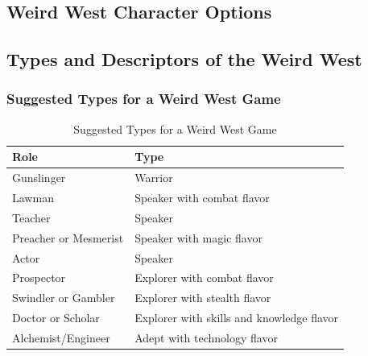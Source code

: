 \begin{multicols}{2}

\chapter{Weird West Character Options}

\section{Types and Descriptors of the Weird West}

\subsection{Suggested Types for a Weird West Game}


\end{multicols}

\begin{table}[h]
\centering 
\caption{Suggested Types for a Weird West Game}
\label{tab:Suggested Types for a Weird West Game}

\begin{tabularx}{\textwidth}{| Y | Y |}
\hline

\textbf{Role} & \textbf{Type} \\ \hline

Gunslinger & Warrior  \\ \hline
Lawman  & 	Speaker with combat flavor  \\ \hline
Teacher  & 	Speaker  \\ \hline
Preacher or Mesmerist  & 	Speaker with magic flavor  \\ \hline
Actor  & 	Speaker  \\ \hline
Prospector  & 	Explorer with combat flavor  \\ \hline
Swindler or Gambler  & 	Explorer with stealth flavor  \\ \hline
Doctor or Scholar  & 	Explorer with skills and knowledge flavor  \\ \hline
Alchemist/Engineer  & 	Adept with technology flavor  \\ \hline

\end{tabularx}
\end{table}

